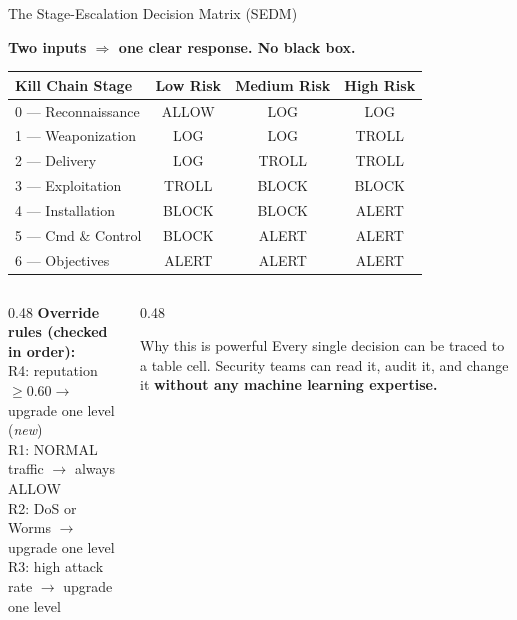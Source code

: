 \documentclass[aspectratio=169, 12pt]{beamer}
\begin{document}
\begin{frame}{The Stage-Escalation Decision Matrix (SEDM)}
  \begin{center}
    \textbf{Two inputs $\Rightarrow$ one clear response. No black box.}
  \end{center}
  \vspace{0.2cm}
  \begin{table}
    \centering
    \small
    \begin{tabular}{lccc}
      \toprule
      \textbf{Kill Chain Stage} & \textbf{Low Risk} & \textbf{Medium Risk} & \textbf{High Risk} \\
      \midrule
      0 --- Reconnaissance  & ALLOW & LOG   & LOG   \\
      1 --- Weaponization   & LOG   & LOG   & TROLL \\
      2 --- Delivery        & LOG   & TROLL & TROLL \\
      3 --- Exploitation    & TROLL & BLOCK & BLOCK \\
      4 --- Installation    & BLOCK & BLOCK & ALERT \\
      5 --- Cmd \& Control  & BLOCK & ALERT & ALERT \\
      6 --- Objectives      & ALERT & ALERT & ALERT \\
      \bottomrule
    \end{tabular}
  \end{table}
  \vspace{0.2cm}
  \begin{columns}[T]
    \begin{column}{0.48\textwidth}
      \textbf{Override rules (checked in order):}\\
      \small
      R4: reputation $\ge 0.60 \to$ upgrade one level (\emph{new})\\
      R1: NORMAL traffic $\to$ always ALLOW\\
      R2: DoS or Worms $\to$ upgrade one level\\
      R3: high attack rate $\to$ upgrade one level
    \end{column}
    \begin{column}{0.48\textwidth}
      \begin{exampleblock}{Why this is powerful}
        Every single decision can be traced to a table cell.
        Security teams can read it, audit it, and change it
        \textbf{without any machine learning expertise.}
      \end{exampleblock}
    \end{column}
  \end{columns}
\end{frame}
\end{document}
